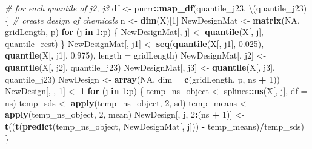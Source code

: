 \documentclass[12pt, twoside]{amherstthesis}
\newenvironment{Shaded}{\begin{snugshade}}{\end{snugshade}}
\newcommand{\AttributeTok}[1]{\textcolor[rgb]{0.13,0.29,0.53}{#1}}
\newcommand{\CommentTok}[1]{\textcolor[rgb]{0.56,0.35,0.01}{\textit{#1}}}
\newcommand{\ConstantTok}[1]{\textcolor[rgb]{0.56,0.35,0.01}{#1}}
\newcommand{\ControlFlowTok}[1]{\textcolor[rgb]{0.13,0.29,0.53}{\textbf{#1}}}
\newcommand{\DecValTok}[1]{\textcolor[rgb]{0.00,0.00,0.81}{#1}}
\newcommand{\FloatTok}[1]{\textcolor[rgb]{0.00,0.00,0.81}{#1}}
\newcommand{\FunctionTok}[1]{\textcolor[rgb]{0.13,0.29,0.53}{\textbf{#1}}}
\newcommand{\NormalTok}[1]{#1}
\newcommand{\OtherTok}[1]{\textcolor[rgb]{0.56,0.35,0.01}{#1}}
\newcommand{\SpecialCharTok}[1]{\textcolor[rgb]{0.81,0.36,0.00}{\textbf{#1}}}
\begin{document}
\begin{Shaded}
\begin{Highlighting}[]
  \CommentTok{\# for each quantile of j2, j3}
\NormalTok{  df }\OtherTok{\textless{}{-}}\NormalTok{ purrr}\SpecialCharTok{::}\FunctionTok{map\_df}\NormalTok{(quantile\_j23, \textbackslash{}(quantile\_j23) \{}
    \CommentTok{\# create design of chemicals}
\NormalTok{    n }\OtherTok{\textless{}{-}} \FunctionTok{dim}\NormalTok{(X)[}\DecValTok{1}\NormalTok{]}
\NormalTok{    NewDesignMat }\OtherTok{\textless{}{-}} \FunctionTok{matrix}\NormalTok{(}\ConstantTok{NA}\NormalTok{, gridLength, p)}
    \ControlFlowTok{for}\NormalTok{ (j }\ControlFlowTok{in} \DecValTok{1}\SpecialCharTok{:}\NormalTok{p) \{}
\NormalTok{      NewDesignMat[, j] }\OtherTok{\textless{}{-}} \FunctionTok{quantile}\NormalTok{(X[, j], quantile\_rest)}
\NormalTok{    \}}
\NormalTok{    NewDesignMat[, j1] }\OtherTok{\textless{}{-}} \FunctionTok{seq}\NormalTok{(}\FunctionTok{quantile}\NormalTok{(X[, j1], }\FloatTok{0.025}\NormalTok{), }
                              \FunctionTok{quantile}\NormalTok{(X[, j1], }\FloatTok{0.975}\NormalTok{), }\AttributeTok{length =}\NormalTok{ gridLength)}
\NormalTok{    NewDesignMat[, j2] }\OtherTok{\textless{}{-}} \FunctionTok{quantile}\NormalTok{(X[, j2], quantile\_j23)}
\NormalTok{    NewDesignMat[, j3] }\OtherTok{\textless{}{-}} \FunctionTok{quantile}\NormalTok{(X[, j3], quantile\_j23)}
\NormalTok{    NewDesign }\OtherTok{\textless{}{-}} \FunctionTok{array}\NormalTok{(}\ConstantTok{NA}\NormalTok{, }\AttributeTok{dim =} \FunctionTok{c}\NormalTok{(gridLength, p, ns }\SpecialCharTok{+} \DecValTok{1}\NormalTok{))}
\NormalTok{    NewDesign[, , }\DecValTok{1}\NormalTok{] }\OtherTok{\textless{}{-}} \DecValTok{1}
    \ControlFlowTok{for}\NormalTok{ (j }\ControlFlowTok{in} \DecValTok{1}\SpecialCharTok{:}\NormalTok{p) \{}
\NormalTok{      temp\_ns\_object }\OtherTok{\textless{}{-}}\NormalTok{ splines}\SpecialCharTok{::}\FunctionTok{ns}\NormalTok{(X[, j], }\AttributeTok{df =}\NormalTok{ ns)}
\NormalTok{      temp\_sds }\OtherTok{\textless{}{-}} \FunctionTok{apply}\NormalTok{(temp\_ns\_object, }\DecValTok{2}\NormalTok{, sd)}
\NormalTok{      temp\_means }\OtherTok{\textless{}{-}} \FunctionTok{apply}\NormalTok{(temp\_ns\_object, }\DecValTok{2}\NormalTok{, mean)}
\NormalTok{      NewDesign[, j, }\DecValTok{2}\SpecialCharTok{:}\NormalTok{(ns }\SpecialCharTok{+} \DecValTok{1}\NormalTok{)] }\OtherTok{\textless{}{-}} \FunctionTok{t}\NormalTok{((}\FunctionTok{t}\NormalTok{(}\FunctionTok{predict}\NormalTok{(temp\_ns\_object, }
\NormalTok{                                                 NewDesignMat[, j])) }\SpecialCharTok{{-}}\NormalTok{ temp\_means)}\SpecialCharTok{/}\NormalTok{temp\_sds)}
\NormalTok{    \}}
    

\end{Highlighting}
\end{Shaded}
\end{document}
